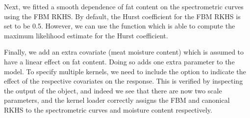 \begin{knitrout}
\color{fgcolor}\begin{kframe}
\begin{alltt}
 \hlkwb{<-} \hlstd{(} \hlopt{^}\hlstd{,}
               \hlstd{=} \hlstd{(} \hlstd{=} \hlstd{(}\hlstd{,} \hlstd{)))}
\end{alltt}
\end{kframe}
\end{knitrout}
\begin{knitrout}
\color{fgcolor}\begin{kframe}
\begin{alltt}
 \hlkwb{<-} \hlstd{(} \hlopt{^}\hlopt{^}\hlstd{,}
               \hlstd{=} \hlstd{(} \hlstd{=} \hlstd{(}\hlstd{,} \hlstd{,} \hlstd{)))}
\end{alltt}
\end{kframe}
\end{knitrout}

Next, we fitted a smooth dependence of fat content on the spectrometric curves using the FBM RKHS. By default, the Hurst coefficient for the FBM RKHS is set to be 0.5. However, we can use the function  which is able to compute the maximum likelihood estimate for the Hurst coefficient.

\begin{knitrout}
\color{fgcolor}\begin{kframe}
\begin{alltt}
 \hlkwb{<-} \hlstd{(}   \hlstd{=} \hlstd{(} \hlstd{=} \hlstd{))}
\end{alltt}
\end{kframe}
\end{knitrout}

Finally, we add an extra covariate (meat moisture content) which is assumed to have a linear effect on fat content. Doing so adds one extra parameter to the model. To specify multiple kernels, we need to include the  option  to indicate the effect of the respective covariates on the response. This is verified by inspecting the  output of the  object, and indeed we see that there are now two scale parameters, and the kernel loader correctly assigns the FBM and canonical RKHS to the spectrometric curves and moisture content respectively.

